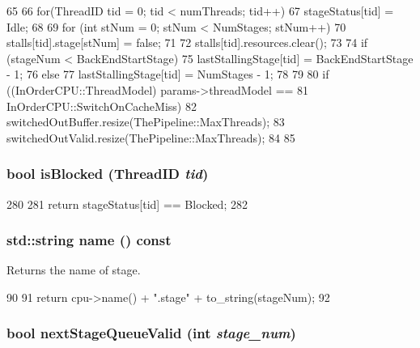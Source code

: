 \begin{DoxyCode}
65 {
66     for(ThreadID tid = 0; tid < numThreads; tid++) {
67         stageStatus[tid] = Idle;
68 
69         for (int stNum = 0; stNum < NumStages; stNum++) {
70             stalls[tid].stage[stNum] = false;
71         }
72         stalls[tid].resources.clear();
73 
74         if (stageNum < BackEndStartStage)
75             lastStallingStage[tid] = BackEndStartStage - 1;
76         else
77             lastStallingStage[tid] = NumStages - 1;
78     }
79 
80     if ((InOrderCPU::ThreadModel) params->threadModel ==
81         InOrderCPU::SwitchOnCacheMiss) {
82         switchedOutBuffer.resize(ThePipeline::MaxThreads);
83         switchedOutValid.resize(ThePipeline::MaxThreads);
84     }
85 }
\end{DoxyCode}
\hypertarget{classPipelineStage_ab8e0f4a73d5a3ab9fe269f3c36d97e4f}{
\subsubsection[{isBlocked}]{\setlength{\rightskip}{0pt plus 5cm}bool isBlocked ({\bf ThreadID} {\em tid})}}
\label{classPipelineStage_ab8e0f4a73d5a3ab9fe269f3c36d97e4f}



\begin{DoxyCode}
280 {
281     return stageStatus[tid] == Blocked;
282 }
\end{DoxyCode}
\hypertarget{classPipelineStage_a37627d5d5bba7f4a8690c71c2ab3cb07}{
\subsubsection[{name}]{\setlength{\rightskip}{0pt plus 5cm}std::string name () const}}
\label{classPipelineStage_a37627d5d5bba7f4a8690c71c2ab3cb07}
Returns the name of stage. 


\begin{DoxyCode}
90 {
91      return cpu->name() + ".stage" + to_string(stageNum);
92 }
\end{DoxyCode}
\hypertarget{classPipelineStage_ab6e550d3e889847f642fa2205c6e12fd}{
\subsubsection[{nextStageQueueValid}]{\setlength{\rightskip}{0pt plus 5cm}bool nextStageQueueValid (int {\em stage\_\-num})}}
\label{classPipelineStage_ab6e550d3e889847f642fa2205c6e12fd}



